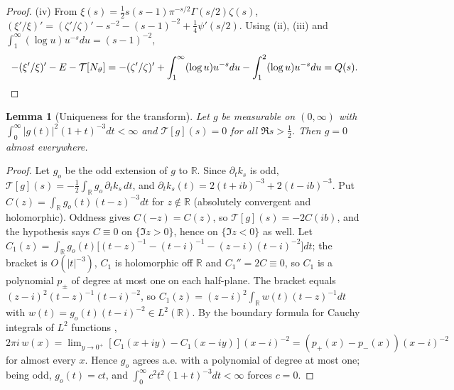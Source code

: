 \documentclass[11pt,a4paper]{article}
\numberwithin{equation}{section}
\newtheorem{lemma}[theorem]{Lemma}
\theoremstyle{definition}
\theoremstyle{remark}
\begin{document}
\begin{proof}
(iv) From $\xi(s)=\frac12s(s-1)\pi^{-s/2}\Gamma(s/2)\zeta(s)$,
$(\xi'/\xi)'=(\zeta'/\zeta)'-s^{-2}-(s-1)^{-2}+\frac14\psi'(s/2)$.
Using (ii), (iii) and $\int_1^\infty(\log u)u^{-s}du=(s-1)^{-2}$,
\begin{equation}
-(\xi'/\xi)'-E-\mathcal T[N_\vartheta]
=-(\zeta'/\zeta)'+\int_1^\infty(\log u)u^{-s}du-\int_1^2(\log u)u^{-s}du
=Q(s).\qedhere
\end{equation}
\end{proof}

\begin{lemma}[Uniqueness for the transform]\label{lem:v8-unique}
Let $g$ be measurable on $(0,\infty)$ with
$\int_0^\infty|g(t)|^2(1+t)^{-3}dt<\infty$ and $\mathcal T[g](s)=0$
for all $\Re s>\frac12$. Then $g=0$ almost everywhere.
\end{lemma}
\begin{proof}
Let $g_o$ be the odd extension of $g$ to $\mathbb R$. Since
$\partial_tk_s$ is odd, $\mathcal T[g](s)=-\frac12\int_{\mathbb R}g_o\,\partial_tk_s\,dt$,
and $\partial_tk_s(t)=2(t+ib)^{-3}+2(t-ib)^{-3}$. Put
$C(z)=\int_{\mathbb R}g_o(t)(t-z)^{-3}dt$ for $z\notin\mathbb R$
(absolutely convergent and holomorphic). Oddness gives $C(-z)=C(z)$,
so $\mathcal T[g](s)=-2C(ib)$, and the hypothesis says $C\equiv0$ on
$\{\Im z>0\}$, hence on $\{\Im z<0\}$ as well. Let
$C_1(z)=\int_{\mathbb R}g_o(t)\bigl[(t-z)^{-1}-(t-i)^{-1}-(z-i)(t-i)^{-2}\bigr]dt$;
the bracket is $O(|t|^{-3})$, $C_1$ is holomorphic off $\mathbb R$ and
$C_1''=2C\equiv0$, so $C_1$ is a polynomial $p_\pm$ of degree at most one on each
half-plane. The bracket equals $(z-i)^2(t-z)^{-1}(t-i)^{-2}$, so
$C_1(z)=(z-i)^2\int_{\mathbb R}w(t)(t-z)^{-1}dt$ with
$w(t)=g_o(t)(t-i)^{-2}\in L^2(\mathbb R)$. By the boundary formula for
Cauchy integrals of $L^2$ functions \cite[Thm.~93]{TitchmarshFI},
$2\pi i\,w(x)=\lim_{y\to0^+}[C_1(x+iy)-C_1(x-iy)](x-i)^{-2}
=(p_+(x)-p_-(x))(x-i)^{-2}$ for almost every $x$. Hence $g_o$ agrees
a.e. with a polynomial of degree at most one; being odd, $g_o(t)=ct$,
and $\int_0^\infty c^2t^2(1+t)^{-3}dt<\infty$ forces $c=0$.
\end{proof}
\end{document}
